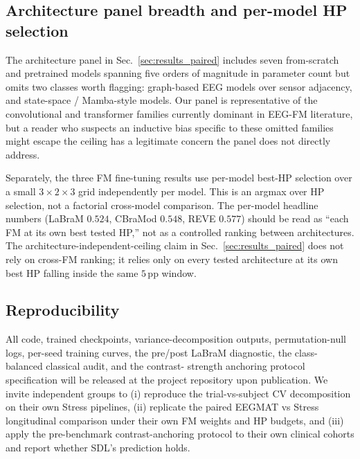 \subsection{Architecture panel breadth and per-model HP selection}
The architecture panel in Sec.~\ref{sec:results_paired} includes
seven from-scratch and pretrained models spanning five orders of
magnitude in parameter count but omits two classes worth flagging:
graph-based EEG models over sensor adjacency, and state-space /
Mamba-style models. Our panel is representative of the convolutional
and transformer families currently dominant in EEG-FM literature, but
a reader who suspects an inductive bias specific to these omitted
families might escape the ceiling has a legitimate concern the panel
does not directly address.

Separately, the three FM fine-tuning results use per-model best-HP
selection over a small $3 \times 2 \times 3$ grid independently per
model. This is an argmax over HP selection, not a factorial
cross-model comparison. The per-model headline numbers
(LaBraM $0.524$, CBraMod $0.548$, REVE $0.577$) should be read as
``each FM at its own best tested HP,'' not as a controlled ranking
between architectures. The architecture-independent-ceiling claim in
Sec.~\ref{sec:results_paired} does not rely on cross-FM ranking; it
relies only on every tested architecture at its own best HP falling
inside the same $5$\,pp window.

\subsection{Reproducibility}
All code, trained checkpoints, variance-decomposition outputs,
permutation-null logs, per-seed training curves, the pre/post LaBraM
diagnostic, the class-balanced classical audit, and the contrast-
strength anchoring protocol specification will be released at the
project repository upon publication. We invite independent groups to
(i) reproduce the trial-vs-subject CV decomposition on their own
Stress pipelines, (ii) replicate the paired EEGMAT vs Stress
longitudinal comparison under their own FM weights and HP budgets,
and (iii) apply the pre-benchmark contrast-anchoring protocol to
their own clinical cohorts and report whether SDL's prediction
holds.
